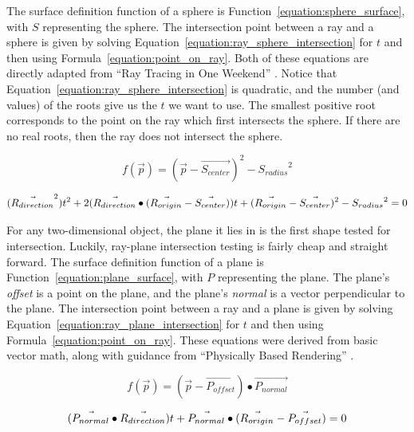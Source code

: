 
The surface definition function of a sphere is Function~\ref{equation:sphere_surface}, with $S$ representing the sphere.
The intersection point between a ray and a sphere is given by solving Equation~\ref{equation:ray_sphere_intersection} for $t$ and then using Formula~\ref{equation:point_on_ray}.
Both of these equations are directly adapted from ``Ray Tracing in One Weekend'' \cite{shirley2016ray}.
Notice that Equation~\ref{equation:ray_sphere_intersection} is quadratic, and the number (and values) of the roots give us the $t$ we want to use.
The smallest positive root corresponds to the point on the ray which first intersects the sphere.
If there are no real roots, then the ray does not intersect the sphere.

\begin{equation}
  \label{equation:sphere_surface}
  f(\vec{p}) = (\vec{p} - \vec{S_{center}})^2 - {S_{radius}}^2
\end{equation}

\begin{equation}
  \label{equation:ray_sphere_intersection}
  (\vec{R_{direction}}^2)t^2 + 2(\vec{R_{direction}} \bullet (\vec{R_{origin}} - \vec{S_{center}}))t + (\vec{R_{origin}} - \vec{S_{center}})^2 - {S_{radius}}^2 = 0
\end{equation}


For any two-dimensional object, the plane it lies in is the first shape tested for intersection.
Luckily, ray-plane intersection testing is fairly cheap and straight forward.
The surface definition function of a plane is Function~\ref{equation:plane_surface}, with $P$ representing the plane.
The plane's {\it offset} is a point on the plane, and the plane's {\it normal} is a vector perpendicular to the plane.
The intersection point between a ray and a plane is given by solving Equation~\ref{equation:ray_plane_intersection} for $t$ and then using Formula~\ref{equation:point_on_ray}.
These equations were derived from basic vector math, along with guidance from ``Physically Based Rendering'' \cite{pharr2016physically}.

\begin{equation}
  \label{equation:plane_surface}
  f(\vec{p}) = (\vec{p} - \vec{P_{offset}}) \bullet \vec{P_{normal}}
\end{equation}

\begin{equation}
  \label{equation:ray_plane_intersection}
  (\vec{P_{normal}} \bullet \vec{R_{direction}})t + \vec{P_{normal}} \bullet (\vec{R_{origin}} - \vec{P_{offset}}) = 0
\end{equation}

